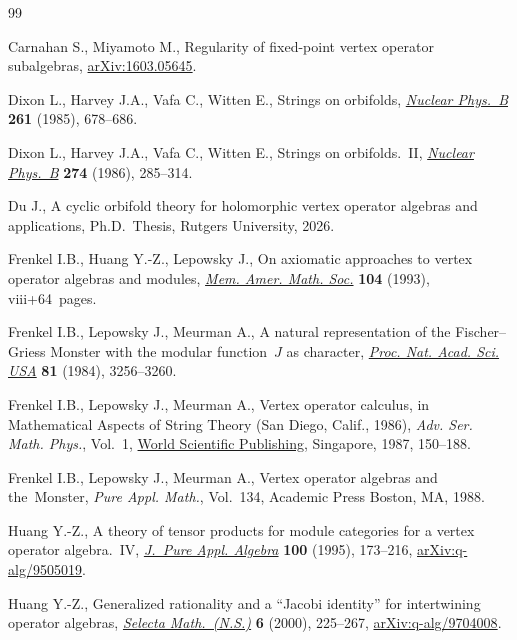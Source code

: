 \begin{thebibliography}{99}
\footnotesize\itemsep=0pt

Carnahan S., Miyamoto M., Regularity of fixed-point vertex operator
 subalgebras, \href{https://arxiv.org/abs/1603.05645}{arXiv:1603.05645}.

Dixon L., Harvey J.A., Vafa C., Witten E., Strings on orbifolds,
 \href{https://doi.org/10.1016/0550-3213(85)90593-0}{\textit{Nuclear Phys.~B}}
 \textbf{261} (1985), 678--686.

Dixon L., Harvey J.A., Vafa C., Witten E., Strings on orbifolds.~{II},
 \href{https://doi.org/10.1016/0550-3213(86)90287-7}{\textit{Nuclear Phys.~B}}
 \textbf{274} (1986), 285--314.

Du J., A cyclic orbifold theory for holomorphic vertex operator algebras and
 applications, Ph.D.~Thesis, {R}utgers University, 2026.

Frenkel I.B., Huang Y.-Z., Lepowsky J., On axiomatic approaches to vertex
 operator algebras and modules,
 \href{https://doi.org/10.1090/memo/0494}{\textit{Mem. Amer. Math. Soc.}}
 \textbf{104} (1993), viii+64~pages.

Frenkel I.B., Lepowsky J., Meurman A., A natural representation of the
 {F}ischer--{G}riess {M}onster with the modular function~{$J$} as character,
 \href{https://doi.org/10.1073/pnas.81.10.3256}{\textit{Proc. Nat. Acad. Sci.
 USA}} \textbf{81} (1984), 3256--3260.

Frenkel I.B., Lepowsky J., Meurman A., Vertex operator calculus, in
 Mathematical {A}spects of {S}tring {T}heory ({S}an {D}iego, {C}alif., 1986),
 \textit{Adv. Ser. Math. Phys.}, Vol.~1,
 \href{https://doi.org/10.1142/9789812798411_0010}{World Scientific
 Publishing}, Singapore, 1987, 150--188.

Frenkel I.B., Lepowsky J., Meurman A., Vertex operator algebras and
 the~{M}onster, \textit{Pure Appl. Math.}, Vol.~134, Academic Press Boston,
 MA, 1988.

Huang Y.-Z., A theory of tensor products for module categories for a vertex
 operator algebra.~{IV},
 \href{https://doi.org/10.1016/0022-4049(95)00050-7}{\textit{J.~Pure Appl.
 Algebra}} \textbf{100} (1995), 173--216,
 \href{https://arxiv.org/abs/q-alg/9505019}{arXiv:q-alg/9505019}.

Huang Y.-Z., Generalized rationality and a ``{J}acobi identity'' for
 intertwining operator algebras,
 \href{https://doi.org/10.1007/PL00001389}{\textit{Selecta Math.~(N.S.)}}
 \textbf{6} (2000), 225--267,
 \href{https://arxiv.org/abs/q-alg/9704008}{arXiv:q-alg/9704008}.


\end{thebibliography}
